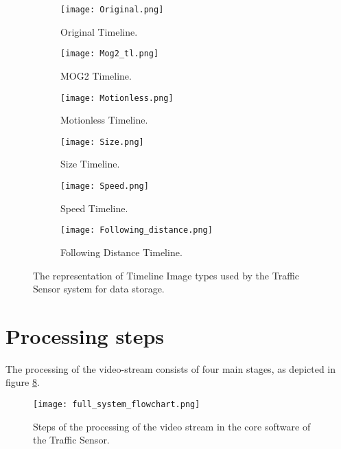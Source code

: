 \begin{figure}[!h]
	\centering
	\begin{subfigure}[!h]{0.9\textwidth}
		\texttt{[image: Original.png]}
		\caption{Original Timeline.\label{fig:original_timeline}}
	\end{subfigure}
	\hfill
	\begin{subfigure}[!h]{0.9\textwidth}
		\texttt{[image: Mog2\_tl.png]}
		\caption{MOG2 Timeline.\label{fig:mog2_timeline}}
	\end{subfigure}
	\hfill
	\begin{subfigure}[!h]{0.9\textwidth}
		\texttt{[image: Motionless.png]}
		\caption{Motionless Timeline. \label{fig:motionless_timeline}}
	\end{subfigure}
	\hfill
	\begin{subfigure}[!h]{0.9\textwidth}
		\texttt{[image: Size.png]}
		\caption{Size Timeline. \label{fig:size_timeline}}
	\end{subfigure}
	\hfill
	\begin{subfigure}[!h]{0.9\textwidth}
		\texttt{[image: Speed.png]}
		\caption{Speed Timeline. \label{fig:speed_timeline}}
	\end{subfigure}
	\hfill
	\begin{subfigure}[!h]{0.9\textwidth}
		\texttt{[image: Following\_distance.png]}
		\caption{Following Distance Timeline. \label{fig:fd_timeline}}
	\end{subfigure}
	\caption[Timeline image types]{The representation of Timeline Image types used by the Traffic Sensor system for data storage.\label{fig:timeline_types}}
\end{figure}

\section{Processing steps}\label{sec:processing_steps}
The processing of the video-stream consists of four main stages, as depicted in figure \ref{fig:processing_steps}.

\begin{figure}[p]
	\thispagestyle{empty}
	\centering
	\vspace*{-.3in}
	\texttt{[image: full\_system\_flowchart.png]}
	\caption[Video processing steps]{Steps of the processing of the video stream in the core software of the Traffic Sensor.\label{fig:processing_steps}}
\end{figure}

